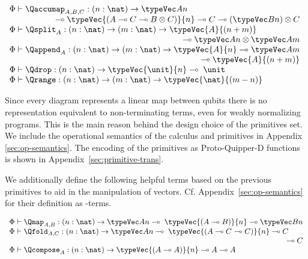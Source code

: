 \begin{center}
$
\begin{array}{l}
    \Phi\vdash \Qaccumap_{A,B,C} : (n:\nat) \to \typeVec A n \;\\
    \multicolumn{1}{r}{\multimap\typeVec{(A \multimap C \multimap B \otimes C)}{n} \multimap C \multimap (\typeVec B n) \otimes C} \\
    \Phi\vdash \Qsplit_A : (n:\nat) \to (m:\nat) \to \typeVec{A}{(n+m)} \\
    \multicolumn{1}{r}{\multimap \typeVec A n \otimes \typeVec A m}\\
    \Phi\vdash \Qappend_A : (n:\nat) \to (m:\nat) \to \typeVec{A}{n} \multimap \typeVec A m \\
    \multicolumn{1}{r}{\qquad\multimap \typeVec{A}{(n+m)}}\\
    \Phi\vdash \Qdrop : (n:\nat) \to \typeVec{\unit}{n} \multimap\; \unit \\
    \Phi\vdash \Qrange : (n:\nat)\to (m:\nat)\to \typeVec{\nat}{(m-n)} \\
\end{array}
$
\end{center}

Since every diagram represents a linear map between qubits there is no
representation equivalent to non-terminating terms, even for weakly normalizing
programs. This is the main reason behind the design choice of the primitives
set.
%
We include the operational semantics of the calculus and primitives in Appendix~
\ref{sec:op-semantics}. The encoding of the primitives as Proto-Quipper-D functions
is shown in Appendix~\ref{sec:primitive-trans}. 

We additionally define the following helpful terms based on the previous
primitives to aid in the manipulation of vectors.
Cf. Appendix~\ref{sec:op-semantics} for their definition as \lambdaD-terms.
\begin{center}
$
\begin{array}{l}
    \Phi\vdash \Qmap_{A,B} : (n:\nat) \to \typeVec A n \multimap\; \typeVec{(A \multimap B)}{n} \multimap \typeVec B n \\
    \Phi\vdash \Qfold_{A,C} : (n:\nat) \to \typeVec A n \multimap\; \typeVec{(A \multimap C \multimap C)}{n} \multimap C \\
    \multicolumn{1}{r}{\multimap C }\\
    \Phi\vdash \Qcompose_{A} : (n:\nat) \to \typeVec{(A \multimap A)}{n} \multimap A \multimap A \\
\end{array}
$
\end{center}

